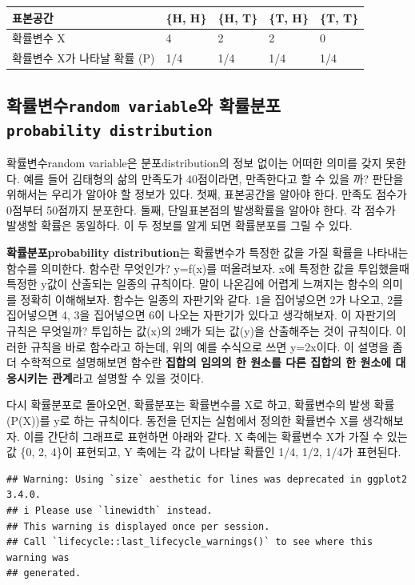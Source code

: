 \documentclass[
]{book}
\begin{document}
\begin{longtable}[]{@{}lllll@{}}
\toprule\noalign{}
표본공간 & \{H, H\} & \{H, T\} & \{T, H\} & \{T, T\} \\
\midrule\noalign{}
\endhead
\bottomrule\noalign{}
\endlastfoot
확률변수 X & 4 & 2 & 2 & 0 \\
확률변수 X가 나타날 확률 (P) & 1/4 & 1/4 & 1/4 & 1/4 \\
\end{longtable}

\subsection{\texorpdfstring{확률변수\texttt{random\ variable}와 확률분포\texttt{probability\ distribution}}{확률변수random variable와 확률분포probability distribution}}\label{uxd655uxb960uxbcc0uxc218random-variableuxc640-uxd655uxb960uxbd84uxd3ecprobability-distribution}

확률변수random variable은 분포distribution의 정보 없이는 어떠한 의미를 갖지 못한다. 예를 들어 김태형의 삶의 만족도가 40점이라면, 만족한다고 할 수 있을 까? 판단을 위해서는 우리가 알아야 할 정보가 있다. 첫째, 표본공간을 알아야 한다. 만족도 점수가 0점부터 50점까지 분포한다. 둘째, 단일표본점의 발생확률을 알아야 한다. 각 점수가 발생할 확률은 동일하다. 이 두 정보를 알게 되면 확률분포를 그릴 수 있다.

\textbf{확률분포probability distribution}는 확률변수가 특정한 값을 가질 확률을 나타내는 함수를 의미한다. 함수란 무엇인가? y=f(x)를 떠올려보자. x에 특정한 값을 투입했을때 특정한 y값이 산출되는 일종의 규칙이다. 말이 나온김에 어렵게 느껴지는 함수의 의미를 정확히 이해해보자. 함수는 일종의 자판기와 같다. 1을 집어넣으면 2가 나오고, 2를 집어넣으면 4, 3을 집어넣으면 6이 나오는 자판기가 있다고 생각해보자. 이 자판기의 규칙은 무엇일까? 투입하는 값(x)의 2배가 되는 값(y)을 산출해주는 것이 규칙이다. 이러한 규칙을 바로 함수라고 하는데, 위의 예를 수식으로 쓰면 y=2x이다.
이 설명을 좀더 수학적으로 설명해보면 함수란 \textbf{집합의 임의의 한 원소를 다른 집합의 한 원소에 대응시키는 관계}라고 설명할 수 있을 것이다.

다시 확률분포로 돌아오면, 확률분포는 확률변수를 X로 하고, 확률변수의 발생 확률(P(X))를 y로 하는 규칙이다. 동전을 던지는 실험에서 정의한 확률변수 X를 생각해보자. 이를 간단히 그래프로 표현하면 아래와 같다. X 축에는 확률변수 X가 가질 수 있는 값 \{0, 2, 4\}이 표현되고, Y 축에는 각 값이 나타날 확률인 1/4, 1/2, 1/4가 표현된다.

\begin{verbatim}
## Warning: Using `size` aesthetic for lines was deprecated in ggplot2 3.4.0.
## i Please use `linewidth` instead.
## This warning is displayed once per session.
## Call `lifecycle::last_lifecycle_warnings()` to see where this warning was
## generated.
\end{verbatim}
\end{document}
